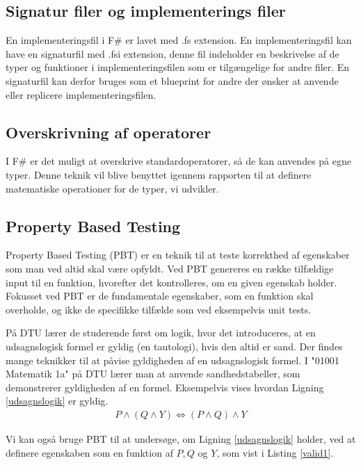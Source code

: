 \subsection{Signatur filer og implementerings filer}
En implementeringsfil i F\# er lavet med .fs extension. En implementeringsfil kan have en signaturfil med .fsi extension, denne fil indeholder en beskrivelse af de typer og funktioner i implementeringsfilen som er tilgængelige for andre filer. En signaturfil kan derfor bruges som et blueprint for andre der ønsker at anvende eller replicere implementeringsfilen.

\subsection{Overskrivning af operatorer}
I F\# er det muligt at overskrive standardoperatorer, så de kan anvendes på egne typer. Denne teknik vil blive benyttet igennem rapporten til at definere matematiske operationer for de typer, vi udvikler.

\subsection{Property Based Testing}
Property Based Testing (PBT) er en teknik til at teste korrekthed af egenskaber som man ved altid skal være opfyldt. Ved PBT genereres en række tilfældige input til en funktion, hvorefter det kontrolleres, om en given egenskab holder. Fokusset ved PBT er de fundamentale egenskaber, som en funktion skal overholde, og ikke de specifikke tilfælde som ved eksempelvis unit tests.

På DTU lærer de studerende først om logik, hvor det introduceres, at en udsagnslogisk formel er gyldig (en tautologi), hvis den altid er sand. Der findes mange teknikker til at påvise gyldigheden af en udsagnslogisk formel. I "01001 Matematik 1a" på DTU lærer man at anvende sandhedstabeller, som demonstrerer gyldigheden af en formel. Eksempelvis vises hvordan Ligning \eqref{udsagnslogik} er gyldig.
\begin{gather}
    P \land (Q \land Y) \iff (P \land Q) \land Y
    \label{udsagnslogik}
\end{gather}

Vi kan også bruge PBT til at undersøge, om Ligning \eqref{udsagnslogik} holder, ved at definere egenskaben som en funktion af $P, Q$ og $Y$, som vist i Listing \ref{valid1}.



